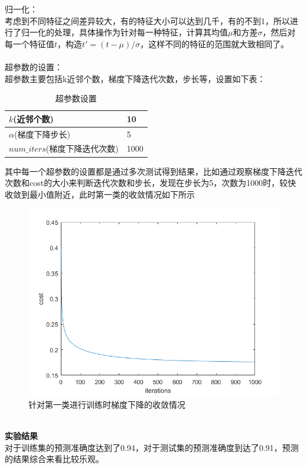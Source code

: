 \documentclass[a4paper,UTF8]{article}
\numberwithin{equation}{section}
\begin{document}
归一化：\\
考虑到不同特征之间差异较大，有的特征大小可以达到几千，有的不到1，所以进行了归一化的处理，具体操作为针对每一种特征，计算其均值$\mu$和方差$\sigma$，然后对每一个特征值$t$，构造$t' = (t-\mu)/\sigma$，这样不同的特征的范围就大致相同了。\\\\
超参数的设置：\\
超参数主要包括k近邻个数，梯度下降迭代次数，步长等，设置如下表：
\begin{table}[!htbp]
	\centering
	\caption{超参数设置}
	\label{my-label}
	\begin{tabular}{|l|l|}
		\hline
		$k$(近邻个数)          & 10    \\ \hline
		$\alpha$(梯度下降步长)     & 5    \\ \hline
		$num\_iters$(梯度下降迭代次数) & 1000 \\ \hline
	\end{tabular}
\end{table}
其中每一个超参数的设置都是通过多次测试得到结果，比如通过观察梯度下降迭代次数和cost的大小来判断迭代次数和步长，发现在步长为5，次数为1000时，较快收敛到最小值附近，此时第一类的收敛情况如下所示
\begin{figure}[ht]
	\centering
	\includegraphics[scale=0.5]{cost.png}
	\caption{针对第一类进行训练时梯度下降的收敛情况}
	\label{fig:label}
\end{figure}\\
\noindent\textbf{实验结果}\\
对于训练集的预测准确度达到了0.94，对于测试集的预测准确度到达了0.91，预测的结果综合来看比较乐观。\\\\
\end{document}
